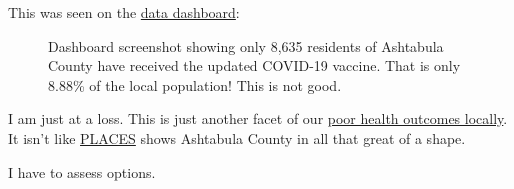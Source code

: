 This was seen on the
\href{https://data.ohio.gov/wps/portal/gov/data/view/covid-19-reporting}{data
dashboard}:

\begin{figure}
\centering
{}
\caption{Dashboard screenshot showing only 8,635 residents of Ashtabula
County have received the updated COVID-19 vaccine. That is only 8.88\%
of the local population! This is not good.}
\end{figure}

I am just at a loss. This is just another facet of our
\href{https://www.countyhealthrankings.org/explore-health-rankings/ohio/ashtabula?year=2023}{poor
health outcomes locally}. It isn't like
\href{https://www.cdc.gov/places/index.html}{PLACES} shows Ashtabula
County in all that great of a shape.

I have to assess options.
